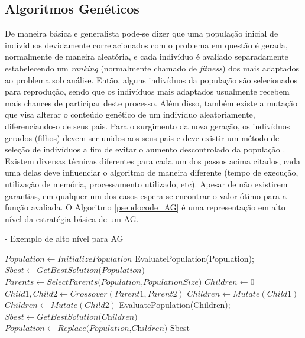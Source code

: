 \subsection{Algoritmos Genéticos}
De maneira básica e generalista pode-se dizer que uma população inicial de indivíduos devidamente correlacionados com o problema em questão é gerada, normalmente de maneira aleatória, e cada indivíduo é avaliado separadamente estabelecendo um \emph{ranking} (normalmente chamado de \emph{fitness}) dos mais adaptados ao problema sob análise. Então, alguns indivíduos da população são selecionados para reprodução, sendo que os indivíduos mais adaptados usualmente recebem mais chances de participar deste processo. Além disso, também existe a mutação que visa alterar o conteúdo genético de um indivíduo aleatoriamente, diferenciando-o de seus pais. Para o surgimento da nova geração, os indivíduos gerados (filhos) devem ser unidos aos seus pais e deve existir um método de seleção de indivíduos a fim de evitar o aumento descontrolado da população \cite{Book-Back2000}. Existem diversas técnicas diferentes para cada um dos passos acima citados, cada uma delas deve influenciar o algoritmo de maneira diferente (tempo de execução, utilização de memória, processamento utilizado, etc). Apesar de não existirem garantias, em qualquer um dos casos espera-se encontrar o valor ótimo para a função avaliada. O Algoritmo \ref{pseudocode_AG} é uma representação em alto nível da estratégia básica de um AG. 

\begin{algorithm} [h]
\caption{ - Exemplo de alto nível para AG}
\begin{algorithmic}[1]
\State $Population\gets \textit{InitializePopulation}$
\State EvaluatePopulation(Population);
\State $Sbest\gets \textit{GetBestSolution(Population)}$
\State $Parents\gets \textit{SelectParents(Population,PopulationSize)}$
\State $Children\gets 0$
\State $Child1, Child2 \gets Crossover(Parent1, Parent2)$
\State $Children \gets Mutate(Child1)$
\State $Children \gets Mutate(Child2)$
\EndFor
\State EvaluatePopulation(Children);
\State $Sbest\gets \textit{GetBestSolution(Children)}$
\State $Population\gets \textit{Replace(Population,Children)}$
\EndWhile
\State\Return Sbest
\end{algorithmic}
\label{pseudocode_AG}
\end{algorithm}
